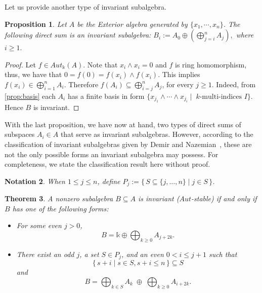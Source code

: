 \documentclass[12pt]{article}
\newtheorem{theorem}{Theorem}
\newtheorem{proposition}[theorem]{Proposition}
\newtheorem{notation}[theorem]{Notation}
\numberwithin{theorem}{section}
\numberwithin{equation}{theorem}
\newcommand{\kk}{\mathds{k}}
\begin{document}
Let us provide another type of invariant subalgebra.
\begin{proposition}
    Let $A$ be the Exterior algebra generated by $ \{x_1, \cdots, x_n\}$. The following direct sum is an invariant subalgebra:
        $B_{i} := A_0 \oplus (\bigoplus_{j=i}^n A_j),$ where $ i \geq 1.$
\end{proposition}
\begin{proof}
    Let $f \in Aut_{\kk}(A)$. Note that $ x_i \wedge x_i = 0$ and $f$ is ring homomorphism, thus, we have that $ 0 = f(0) = f(x_i) \wedge f(x_i)$. This implies $f(x_i) \in \bigoplus_{i = 1} ^{n}  A_i  $. Therefore $ f(A_i) \subseteq \bigoplus_{i = j} ^{n}  A_j $, for every $j \geq 1$. Indeed, from \ref{prop:basis} each $A_i$ has a finite basis in form $ \{ x_{j_1} \wedge \cdots \wedge x_{j_i} \mid \;k\text{-multi-indices } I\} $. Hence $B$  is invariant. 
\end{proof}

With the last proposition, we have now at hand, two types of direct sums of subspaces $A_i \in A$ that serve as invariant subalgebras. However, according to the classification of invariant subalgebras given by Demir and Nazemian~\cite{zahra-konur}, these are not the only possible forms an invariant subalgebra may possess. For completeness, we state the classification result here without proof.

\begin{notation}
    When  $1 \leq j \leq n$, define $P_j := \{\, S \subseteq \{ j, \dots, n \} \mid j \in S \,\}$. 
\end{notation}

\begin{theorem}
A nonzero subalgebra $B \subseteq {A}$ is invariant ($Aut$-stable) if and only if $B$ has one of the following forms:
\begin{itemize}
    \item[(a)] For some even $j > 0$,  
    \[
    B = \kk \oplus \bigoplus_{k \geq 0} A_{j+2k}.
    \]
\medskip
    \item[(b)]  There exist an odd $j$, a set $S \in P_j$, and an even $0 < i \leq j+1$ such that 
    \[
    \{\,s+i \mid s \in S, s+ i \leq n \,\}   \subseteq S
    \]
    and
    \[
    B = \bigoplus_{k \in S} A_{k} \;\oplus\; \bigoplus_{k \geq 0} A_{i+2k}.
    \]
\end{itemize}
\end{theorem}
\end{document}
